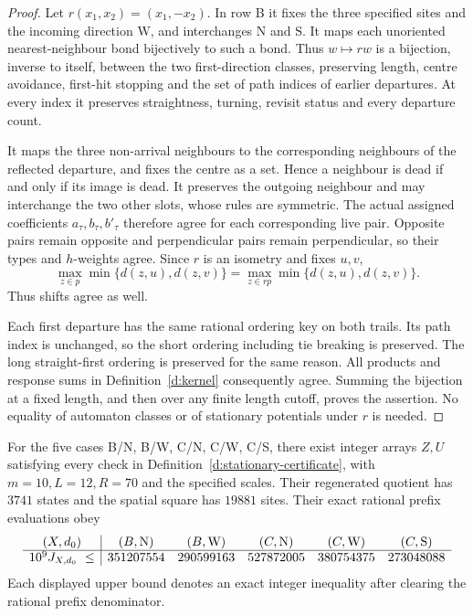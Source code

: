 \begin{proof}
Let \(r(x_1,x_2)=(x_1,-x_2)\). In row B it fixes the three
specified sites and the incoming direction \(\mathrm W\), and
interchanges \(\mathrm N\) and \(\mathrm S\). It maps each
unoriented nearest-neighbour bond bijectively to such a bond. Thus
\(w\mapsto rw\) is a bijection, inverse to itself, between the
two first-direction classes, preserving length, centre avoidance,
first-hit stopping and the set of path indices of earlier
departures. At every index it preserves straightness, turning,
revisit status and every departure count.

It maps the three non-arrival neighbours to the corresponding
neighbours of the reflected departure, and fixes the centre as a
set. Hence a neighbour is dead if and only if its image is dead.
It preserves the outgoing neighbour and may interchange the two
other slots, whose rules are symmetric. The actual assigned
coefficients \(a_\tau,b_\tau,b'_\tau\) therefore agree for each
corresponding live pair. Opposite pairs remain opposite and
perpendicular pairs remain perpendicular, so their types and
\(h\)-weights agree. Since \(r\) is an isometry and fixes \(u,v\),
\[
 \max_{z\in p}\min\{d(z,u),d(z,v)\}
 =\max_{z\in rp}\min\{d(z,u),d(z,v)\}.
\]
Thus shifts agree as well.

Each first departure has the same rational ordering key on both
trails. Its path index is unchanged, so the short ordering including
tie breaking is preserved. The long straight-first ordering is
preserved for the same reason. All products and response sums
in Definition~\ref{d:kernel} consequently agree. Summing the
bijection at a fixed length, and then over any finite length cutoff,
proves the assertion. No equality of automaton classes or of
stationary potentials under \(r\) is needed.
\end{proof}

\begin{proposition}\label{p:stationary-check}
For the five cases B/N, B/W, C/N, C/W, C/S, there exist
integer arrays \(Z,U\) satisfying every check in
Definition~\ref{d:stationary-certificate}, with
\(m=10,L=12,R=70\) and the specified scales.
Their regenerated quotient has \(3741\) states and the spatial
square has \(19881\) sites. Their exact rational prefix evaluations obey
\[
 \begin{array}{c|ccccc}
 (X,d_0)&(B,{\rm N})&(B,{\rm W})&(C,{\rm N})&(C,{\rm W})&(C,{\rm S})\\ \hline
 10^9J_{X,d_0}\ \le&
 351207554&290599163&527872005&380754375&273048088
 \end{array}
\]
Each displayed upper bound denotes an exact integer inequality
after clearing the rational prefix denominator.
\end{proposition}

